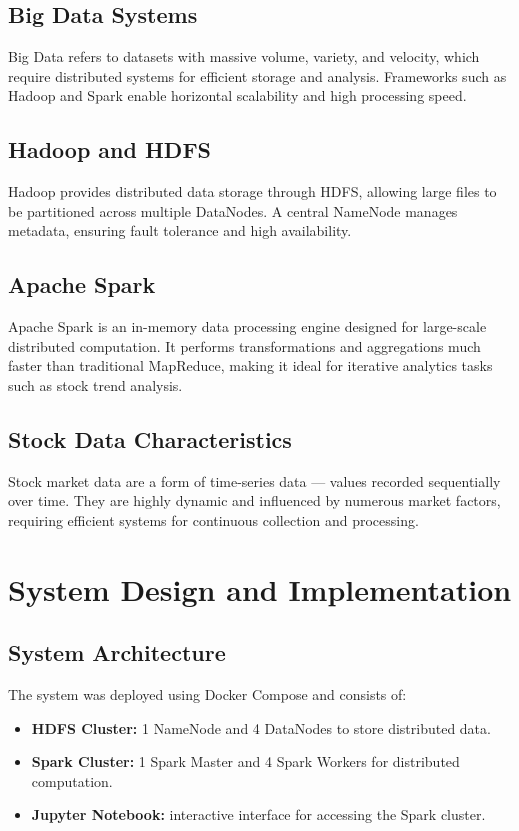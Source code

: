 \documentclass[12pt,a4paper]{article}
\begin{document}
\subsection{Big Data Systems}
Big Data refers to datasets with massive volume, variety, and velocity, which require distributed systems for efficient storage and analysis.  
Frameworks such as Hadoop and Spark enable horizontal scalability and high processing speed.

\subsection{Hadoop and HDFS}
Hadoop provides distributed data storage through HDFS, allowing large files to be partitioned across multiple DataNodes.  
A central NameNode manages metadata, ensuring fault tolerance and high availability.

\subsection{Apache Spark}
Apache Spark is an in-memory data processing engine designed for large-scale distributed computation.  
It performs transformations and aggregations much faster than traditional MapReduce, making it ideal for iterative analytics tasks such as stock trend analysis.

\subsection{Stock Data Characteristics}
Stock market data are a form of time-series data — values recorded sequentially over time.  
They are highly dynamic and influenced by numerous market factors, requiring efficient systems for continuous collection and processing.

\section{System Design and Implementation}

\subsection{System Architecture}
The system was deployed using Docker Compose and consists of:

\begin{itemize}
    \item \textbf{HDFS Cluster:} 1 NameNode and 4 DataNodes to store distributed data.
    \item \textbf{Spark Cluster:} 1 Spark Master and 4 Spark Workers for distributed computation.
    \item \textbf{Jupyter Notebook:} interactive interface for accessing the Spark cluster.
\end{itemize}
\end{document}

